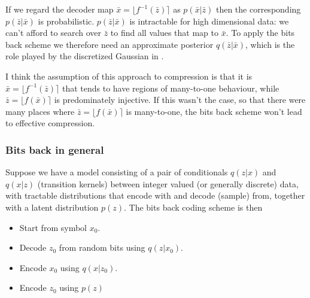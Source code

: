 \documentclass[preprint,notitlepage]{revtex4-1}
\begin{document}
If we regard the decoder map $\bar x = \lfloor f^{-1}(\bar z)\rceil$ as $p(\bar x|\bar z)$ then the corresponding $p(\bar z|\bar x)$ is probabilistic. $p(\bar z|\bar x)$ is intractable for high dimensional data: we can't afford to search over $\bar z$ to find all values that map to $\bar x$. To apply the bits back scheme we therefore need an approximate posterior $q(\bar z|\bar x)$, which is the role played by the discretized Gaussian in \cite{Ho:2019aa}.

I think the assumption of this approach to compression is that it is $\bar x = \lfloor f^{-1}(\bar z)\rceil$ that tends to have regions of many-to-one behaviour, while $\bar z = \lfloor f(\bar x)\rceil$ is predominately injective. If this wasn't the case, so that there were many places where $\bar z = \lfloor f(\bar x)\rceil$ is many-to-one, the bits back scheme won't lead to effective compression.

\subsubsection{Bits back in general}

Suppose we have a model consisting of a pair of conditionals $q(z|x)$ and $q(x|z)$ (transition kernels) between integer valued (or generally discrete) data, with tractable distributions that encode with and decode (sample) from, together with a latent distribution $p(z)$. The bits back coding scheme is then

\begin{itemize}
  \item Start from symbol $x_0$.
  \item Decode $z_0$ from random bits using $q(z|x_0)$.
  \item Encode $x_0$ using $q(x|z_0)$.
  \item Encode $z_0$ using $p(z)$
\end{itemize}
\end{document}

